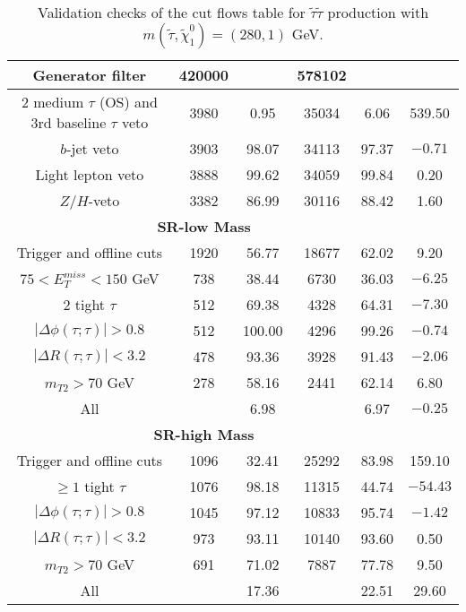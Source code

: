 \documentclass[12pt,A4paper,pdftex, ]{article}
\begin{document}
\begin{table}[h!]
\begin{center}
\begin{tabular}{|c|c|c|c|c|c|}
Generator filter & 420000 &  & 578102 &  & \\ \hline
2 medium $\tau$ (OS) and 3rd baseline $\tau$ veto & 3980 & 0.95 & 35034 & 6.06 & 539.50 \\ \hline
$b$-jet veto & 3903 & 98.07 & 34113 & 97.37 & $-0.71$ \\ \hline
Light lepton veto & 3888 & 99.62 & 34059 & 99.84 & 0.20 \\ \hline
$Z/H$-veto & 3382 & 86.99 & 30116 & 88.42 & 1.60 \\ \hline
%
\multicolumn{5}{|c|}{ \textbf{SR-low Mass} }\\\hline
%
Trigger and offline cuts & 1920 & 56.77 & 18677 & 62.02 & 9.20 \\ \hline
$ 75 < E^{miss}_T < 150 $ GeV & 738 & 38.44 & 6730 & 36.03 & $-6.25$ \\ \hline
2 tight $\tau$ & 512 & 69.38 & 4328 & 64.31 & $-7.30$ \\ \hline
$ |\Delta\phi(\tau;\tau)| > 0.8 $ & 512 & 100.00 & 4296 & 99.26 & $-0.74$ \\ \hline
$ |\Delta R(\tau;\tau)| < 3.2 $ & 478 & 93.36 & 3928 & 91.43 & $-2.06$ \\ \hline
$ m_{T2} > 70 $ GeV & 278 & 58.16 & 2441 & 62.14 & 6.80 \\ \hline
All &  & 6.98 &  & 6.97 & $-0.25$ \\ \hline
%
\hline
\multicolumn{5}{|c|}{ \textbf{SR-high Mass} }\\\hline
%
Trigger and offline cuts & 1096 & 32.41 & 25292 & 83.98 & 159.10 \\ \hline
$ \geq 1 $ tight $\tau$ & 1076 & 98.18 & 11315 & 44.74 & $-54.43$ \\ \hline
$ |\Delta\phi(\tau;\tau)| > 0.8 $ & 1045 & 97.12 & 10833 & 95.74 & $-1.42$ \\ \hline
$ |\Delta R(\tau;\tau)| < 3.2 $ & 973 & 93.11 & 10140 & 93.60 & 0.50 \\ \hline
$ m_{T2} > 70 $ GeV & 691 & 71.02 & 7887 & 77.78 & 9.50 \\ \hline
All &  & 17.36 &  & 22.51 & 29.60 \\ \hline

\end{tabular}
\end{center}
\caption{Validation checks of the cut flows table for $ \tilde{\tau}\tilde{\tau} $ production with $ m(\tilde{\tau},\tilde{\chi}^0_1) = (280,1) $ GeV.}
\label{280GeV}
\end{table} 
\end{document}
